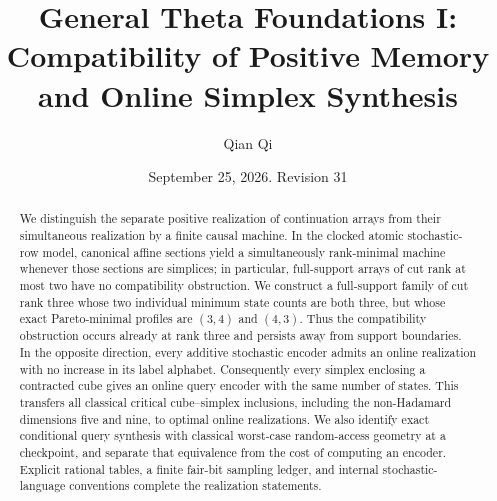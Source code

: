\documentclass[11pt]{amsart}
\title[Compatibility of positive memory]{General Theta Foundations I:\\Compatibility of Positive Memory and Online Simplex Synthesis}
\author{Qian Qi}
\date{September 25, 2026. Revision 31}
\theoremstyle{definition}\newtheorem{definition}[theorem]{Definition}
\theoremstyle{remark}\newtheorem{remark}[theorem]{Remark}
\newcommand{\1}{\mathbf1}
\begin{document}
\begin{abstract}
We distinguish the separate positive realization of continuation arrays
from their simultaneous realization by a finite causal machine. In the
clocked atomic stochastic-row model, canonical affine sections yield a
simultaneously rank-minimal machine whenever those sections are simplices;
in particular, full-support arrays of cut rank at most two have no
compatibility obstruction. We construct a full-support family of cut rank
three whose two individual minimum state counts are both three, but whose
exact Pareto-minimal profiles are $(3,4)$ and $(4,3)$. Thus the compatibility
obstruction occurs already at rank three and persists away from support
boundaries. In the opposite direction, every additive stochastic encoder
admits an online realization with no increase in its label alphabet.
Consequently every simplex enclosing a contracted cube gives an online
query encoder with the same number of states. This transfers all classical
critical cube--simplex inclusions, including the non-Hadamard dimensions
five and nine, to optimal online realizations. We also identify exact
conditional query synthesis with classical worst-case random-access
geometry at a checkpoint, and separate that equivalence from the cost of
computing an encoder. Explicit rational tables, a finite fair-bit sampling
ledger, and internal stochastic-language conventions complete the
realization statements.
\end{abstract}
\maketitle









\end{document}
